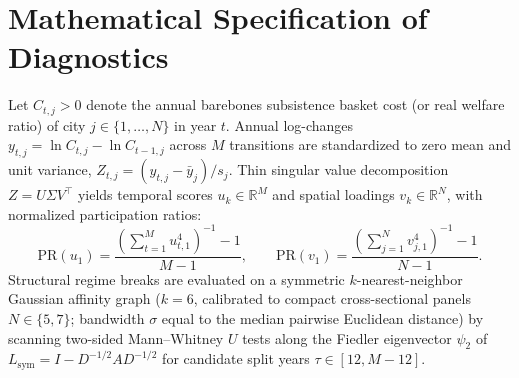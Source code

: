\documentclass[11pt,a4paper]{article}
\begin{document}
\section{Mathematical Specification of Diagnostics}
Let $C_{t,j} > 0$ denote the annual barebones subsistence basket cost (or real welfare ratio) of city $j \in \{1,\dots,N\}$ in year $t$. Annual log-changes $y_{t,j} = \ln C_{t,j} - \ln C_{t-1,j}$ across $M$ transitions are standardized to zero mean and unit variance, $Z_{t,j} = (y_{t,j} - \bar{y}_j)/s_j$. Thin singular value decomposition $Z = U \Sigma V^\top$ yields temporal scores $u_k \in \mathbb{R}^M$ and spatial loadings $v_k \in \mathbb{R}^N$, with normalized participation ratios:
\begin{equation}
\mathrm{PR}(u_1) = \frac{\left(\sum_{t=1}^M u_{t,1}^4\right)^{-1} - 1}{M - 1}, \qquad
\mathrm{PR}(v_1) = \frac{\left(\sum_{j=1}^N v_{j,1}^4\right)^{-1} - 1}{N - 1}.
\end{equation}
Structural regime breaks are evaluated on a symmetric $k$-nearest-neighbor Gaussian affinity graph ($k=6$, calibrated to compact cross-sectional panels $N \in \{5,7\}$; bandwidth $\sigma$ equal to the median pairwise Euclidean distance) by scanning two-sided Mann--Whitney $U$ tests along the Fiedler eigenvector $\psi_2$ of $L_{\mathrm{sym}} = I - D^{-1/2} A D^{-1/2}$ for candidate split years $\tau \in [12, M-12]$.
\end{document}

